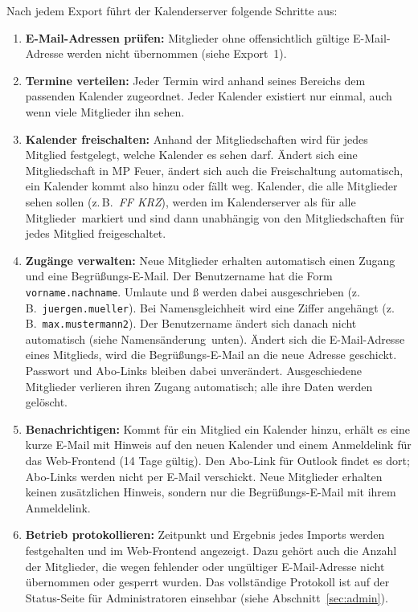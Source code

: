 \documentclass[a4paper,fontsize=10pt]{scrartcl}
\begin{document}
Nach jedem Export führt der Kalenderserver folgende Schritte aus:

\begin{enumerate}
  \item \textbf{E-Mail-Adressen prüfen:} Mitglieder ohne offensichtlich
        gültige E-Mail-Adresse werden nicht übernommen (siehe Export~1).
  \item \textbf{Termine verteilen:} Jeder Termin wird anhand seines Bereichs
        dem passenden Kalender zugeordnet. Jeder Kalender existiert nur
        einmal, auch wenn viele Mitglieder ihn sehen.
  \item \textbf{Kalender freischalten:} Anhand der Mitgliedschaften wird für
        jedes Mitglied festgelegt, welche Kalender es sehen darf. Ändert sich
        eine Mitgliedschaft in MP Feuer, ändert sich auch die Freischaltung
        automatisch, ein Kalender kommt also hinzu oder fällt weg. Kalender,
        die alle Mitglieder sehen sollen (z.\,B.\ \emph{FF KRZ}), werden im
        Kalenderserver als \glqq für alle Mitglieder\grqq\ markiert und sind
        dann unabhängig von den Mitgliedschaften für jedes Mitglied
        freigeschaltet.
  \item \textbf{Zugänge verwalten:} Neue Mitglieder erhalten automatisch
        einen Zugang und eine Begrüßungs-E-Mail. Der
        Benutzername hat die Form \texttt{vorname.nachname}. Umlaute und ß
        werden dabei ausgeschrieben (z.\,B.\ \texttt{juergen.mueller}). Bei
        Namensgleichheit wird eine Ziffer angehängt (z.\,B.\
        \texttt{max.mustermann2}). Der Benutzername ändert sich danach nicht
        automatisch (siehe \glqq Namensänderung\grqq\ unten).
        Ändert sich die E-Mail-Adresse eines Mitglieds, wird die
        Begrüßungs-E-Mail an die neue Adresse geschickt. Passwort und
        Abo-Links bleiben dabei unverändert.
        Ausgeschiedene Mitglieder verlieren ihren Zugang automatisch; alle
        ihre Daten werden gelöscht.
  \item \textbf{Benachrichtigen:} Kommt für ein Mitglied ein Kalender hinzu,
        erhält es eine kurze E-Mail mit Hinweis auf den neuen Kalender und
        einem Anmeldelink für das Web-Frontend (14 Tage gültig). Den
        Abo-Link für Outlook findet es dort; Abo-Links werden nicht per
        E-Mail verschickt. Neue Mitglieder erhalten keinen zusätzlichen
        Hinweis, sondern nur die Begrüßungs-E-Mail mit ihrem Anmeldelink.
  \item \textbf{Betrieb protokollieren:} Zeitpunkt und Ergebnis jedes
        Imports werden festgehalten und im Web-Frontend angezeigt. Dazu
        gehört auch die Anzahl der Mitglieder, die wegen fehlender oder
        ungültiger E-Mail-Adresse nicht übernommen oder gesperrt wurden. Das
        vollständige Protokoll ist auf der Status-Seite für Administratoren
        einsehbar (siehe Abschnitt~\ref{sec:admin}).
\end{enumerate}
\end{document}

